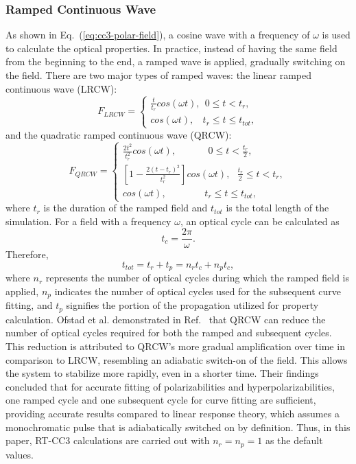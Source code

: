 \subsubsection{Ramped Continuous Wave} \label{theory-cc3-24}
As shown in Eq.~(\ref{eq:cc3-polar-field}), a cosine wave with a frequency of $\omega$ is used to calculate the optical properties. In practice, instead of having the same field from the beginning to the end, a ramped wave is applied, gradually switching on the field. There are two major types of ramped waves: the linear ramped continuous wave (LRCW):
\begin{equation}
F_{LRCW}=\begin{cases}
\frac{t}{t_{r}}cos(\omega t), \ \ 0\le t < t_{r} ,\\
cos(\omega t),\ \ \  \ t_{r}\le t \le t_{tot},
\end{cases}
\end{equation}
and the quadratic ramped continuous wave (QRCW):
\begin{equation}
 F_{QRCW}=\begin{cases}
\frac{2t^{2}}{t_{r}^{2}}cos(\omega t),\ \ \ \ \ \ \ \ \ \ \ \ \ \ \ 0\le t < \frac{t_{r}}{2} ,\\
[1-\frac{2(t-t_{r})^{2}}{t_{r}^{2}}]cos(\omega t), \ \ \ \frac{t_{r}}{2}\le t < t_{r} ,\\
cos(\omega t),\ \ \  \ \ \ \ \ \ \ \ \ \ \ \ \ \ \ t_{r}\le t \le t_{tot},
\end{cases}
\end{equation}
where $t_{r}$ is the duration of the ramped field and $t_{tot}$ is the total length of the simulation. For a field with a frequency $\omega$, an optical cycle can be calculated as 
\begin{equation}
t_{c} = \frac{2\pi}{\omega}.
\end{equation}
Therefore,
\begin{equation}
t_{tot} = t_{r} + t_{p} = n_{r}t_{c} + n_{p}t_{c},
\end{equation}
where $n_{r}$ represents the number of optical cycles during which the ramped field is applied, $n_{p}$ indicates the number of optical cycles used for the subsequent curve fitting, and $t_{p}$ signifies the portion of the propagation utilized for property calculation. Ofstad et al. demonstrated in Ref.~ that QRCW can reduce the number of optical cycles required for both the ramped and subsequent cycles. This reduction is attributed to QRCW's more gradual amplification over time in comparison to LRCW, resembling an adiabatic switch-on of the field. This allows the system to stabilize more rapidly, even in a shorter time. Their findings concluded that for accurate fitting of polarizabilities and hyperpolarizabilities, one ramped cycle and one subsequent cycle for curve fitting are sufficient, providing accurate results compared to linear response theory, which assumes a monochromatic pulse that is adiabatically switched on by definition. Thus, in this paper, RT-CC3 calculations are carried out with $n_{r}=n_{p}=1$ as the default values. 

